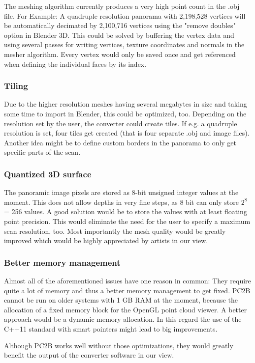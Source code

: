 The meshing algorithm currently produces a very high point count in the .obj file. For Example: A quadruple resolution panorama with 2,198,528 vertices will be automatically decimated by 2,100,716 vertices using the "remove doubles" option in Blender 3D.
This could be solved by buffering the vertex data and using several passes for writing vertices, texture coordinates and normals in the mesher algorithm. Every vertex would only be saved once and get referenced when defining the individual faces by its index.

\subsubsection{Tiling}

Due to the higher resolution meshes having several megabytes in size and taking some time to import in Blender, this could be optimized, too.
Depending on the resolution set by the user, the converter could create tiles. If e.g. a quadruple resolution is set, four tiles get created (that is four separate .obj and image files). Another idea might be to define custom borders in the panorama to only get specific parts of the scan.

\subsubsection{Quantized 3D surface}

The panoramic image pixels are stored as 8-bit unsigned integer values at the moment. This does not allow depths in very fine steps, as 8 bit can only store $2^{8}$ = 256 values. A good solution would be to store the values with at least floating point precision. This would eliminate the need for the user to specify a maximum scan resolution, too. Most importantly the mesh quality would be greatly improved which would be highly appreciated by artists in our view.

\subsubsection{Better memory management}

Almost all of the aforementioned issues have one reason in common: They require quite a lot of memory and thus a better memory management to get fixed. PC2B cannot be run on older systems with 1 GB RAM at the moment, because the allocation of a fixed memory block for the OpenGL point cloud viewer. A better approach would be a dynamic memory allocation. In this regard the use of the C++11 standard with smart pointers might lead to big improvements.

Although PC2B works well without those optimizations, they would greatly benefit the output of the converter software in our view.